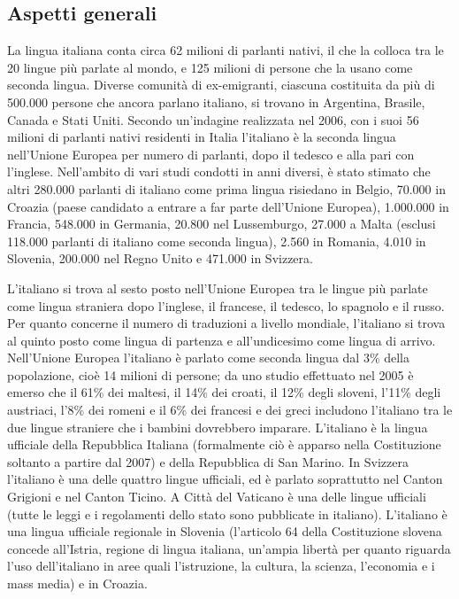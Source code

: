 \documentclass[]{../../metanetpaper}
\begin{document}
\begin{multicols}{2}

\subsection{Aspetti generali}

La lingua italiana conta circa 62 milioni di parlanti nativi, il che la colloca tra le 20 lingue pi\`{u} parlate al mondo, e 125 milioni di persone che la usano come seconda lingua. Diverse comunit\`{a} di ex-emigranti, ciascuna costituita da pi\`{u} di 500.000 persone che ancora parlano italiano, si trovano in Argentina, Brasile, Canada e Stati Uniti. Secondo un'indagine realizzata nel 2006,  con i suoi 56 milioni di parlanti nativi residenti in Italia l'italiano \`{e} la seconda lingua nell'Unione Europea per numero di parlanti, dopo il tedesco e alla pari con l'inglese. Nell'ambito di vari studi condotti in anni diversi, \`{e} stato stimato che altri 280.000 parlanti di italiano come prima lingua risiedano in Belgio, 70.000 in Croazia (paese candidato a entrare a far parte dell'Unione Europea), 1.000.000 in Francia, 548.000 in Germania, 20.800 nel Lussemburgo, 27.000 a Malta (esclusi 118.000 parlanti di italiano come seconda lingua), 2.560 in Romania, 4.010 in Slovenia, 200.000 nel Regno Unito e 471.000 in Svizzera.



L'italiano si trova al sesto posto nell'Unione Europea tra le lingue pi\`{u} parlate come lingua straniera dopo l'inglese, il francese, il tedesco, lo spagnolo e il russo. Per quanto concerne il numero di traduzioni a livello mondiale, l'italiano si trova al quinto posto come lingua di partenza e all'undicesimo come lingua di arrivo. 
Nell'Unione Europea l'italiano \`{e} parlato come seconda lingua dal 3\% della popolazione, cio\`{e} 14 milioni di persone; da uno studio effettuato nel 2005 \`{e} emerso che il 61\% dei maltesi, il 14\% dei croati, il 12\% degli sloveni, l'11\% degli austriaci, l'8\% dei romeni e il 6\% dei francesi e dei greci includono l'italiano tra le due lingue straniere che i bambini dovrebbero imparare.
L'italiano \`{e} la lingua ufficiale della Repubblica Italiana (formalmente
ci\`{o} \`{e} apparso nella Costituzione soltanto a partire dal 2007) e della
Repubblica di San Marino. In Svizzera l'italiano \`{e} una delle quattro
lingue ufficiali, ed \`{e} parlato soprattutto nel Canton Grigioni e nel
Canton Ticino. A Citt\`{a} del Vaticano \`{e} una delle lingue ufficiali
(tutte le leggi e i regolamenti dello stato sono pubblicate in
italiano). L'italiano \`{e} una lingua ufficiale regionale in Slovenia
(l'articolo 64 della Costituzione slovena concede all'Istria, regione di
lingua italiana, un'ampia libert\`{a} per quanto riguarda l'uso dell'italiano
in aree quali l'istruzione, la cultura, la scienza, l'economia e i mass media)
e in Croazia. 



\end{multicols}
\end{document}
